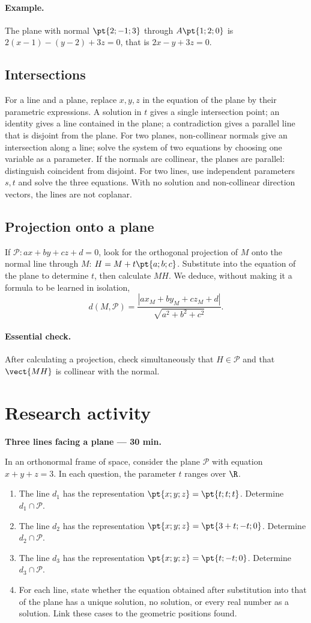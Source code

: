 \paragraph{Example.} The plane with normal $\pt{2;-1;3}$ through $A\pt{1;2;0}$ is $2(x-1)-(y-2)+3z=0$, that is $2x-y+3z=0$.
\subsection{Intersections}
For a line and a plane, replace $x,y,z$ in the equation of the plane by their parametric expressions. A solution in $t$ gives a single intersection point; an identity gives a line contained in the plane; a contradiction gives a parallel line that is disjoint from the plane.
For two planes, non-collinear normals give an intersection along a line; solve the system of two equations by choosing one variable as a parameter. If the normals are collinear, the planes are parallel: distinguish coincident from disjoint.
For two lines, use independent parameters $s,t$ and solve the three equations. With no solution and non-collinear direction vectors, the lines are not coplanar.
\subsection{Projection onto a plane}
If $\mathcal P:ax+by+cz+d=0$, look for the orthogonal projection of $M$ onto the normal line through $M$: $H=M+t\pt{a;b;c}$. Substitute into the equation of the plane to determine $t$, then calculate $MH$.
We deduce, without making it a formula to be learned in isolation,
\[d(M,\mathcal P)=\frac{|ax_M+by_M+cz_M+d|}{\sqrt{a^2+b^2+c^2}}.\]
\paragraph{Essential check.} After calculating a projection, check simultaneously that $H\in\mathcal P$ and that $\vect{MH}$ is collinear with the normal.


\mxnewpage
\section{Research activity}\textbf{Three lines facing a plane --- 30 min.}\par In an orthonormal frame of space, consider the plane $\mathcal P$ with equation $x+y+z=3$. In each question, the parameter $t$ ranges over $\R$.
\begin{enumerate}\item The line $d_1$ has the representation $\pt{x;y;z}=\pt{t;t;t}$. Determine $d_1\cap\mathcal P$.
\item The line $d_2$ has the representation $\pt{x;y;z}=\pt{3+t;-t;0}$. Determine $d_2\cap\mathcal P$.
\item The line $d_3$ has the representation $\pt{x;y;z}=\pt{t;-t;0}$. Determine $d_3\cap\mathcal P$.
\item For each line, state whether the equation obtained after substitution into that of the plane has a unique solution, no solution, or every real number as a solution. Link these cases to the geometric positions found.\end{enumerate}

